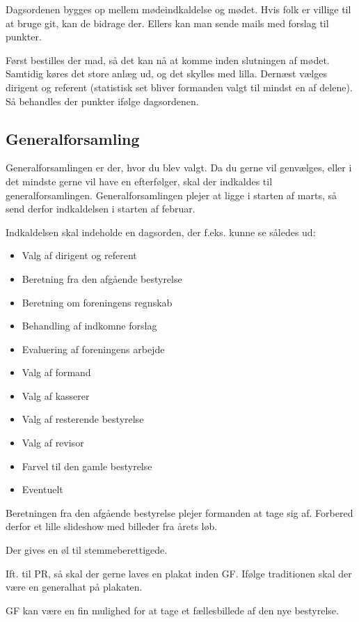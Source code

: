 Dagsordenen bygges op mellem mødeindkaldelse og mødet. Hvis folk er
villige til at bruge git, kan de bidrage der. Ellers kan man sende
mails med forslag til punkter.

Først bestilles der mad, så det kan nå at komme inden slutningen af
mødet. Samtidig køres det store anlæg ud, og det skylles med
lilla. Dernæst vælges dirigent og referent (statistisk set bliver
formanden valgt til mindst en af delene). Så behandles der punkter
ifølge dagsordenen.

\subsection{Generalforsamling}
\label{sec:generalforsamling}

Generalforsamlingen er der, hvor du blev valgt. Da du gerne vil
genvælges, eller i det mindste gerne vil have en efterfølger, skal der
indkaldes til generalforsamlingen. Generalforsamlingen plejer at ligge
i starten af marts, så send derfor indkaldelsen i starten af februar.

Indkaldelsen skal indeholde en dagsorden, der f.eks. kunne se således
ud:
\begin{itemize}
\item Valg af dirigent og referent
\item Beretning fra den afgående bestyrelse
\item Beretning om foreningens regnskab
\item Behandling af indkomne forslag
\item Evaluering af foreningens arbejde
\item Valg af formand
\item Valg af kasserer
\item Valg af resterende bestyrelse
\item Valg af revisor
\item Farvel til den gamle bestyrelse
\item Eventuelt
\end{itemize}

Beretningen fra den afgående bestyrelse plejer formanden at tage sig
af. Forbered derfor et lille slideshow med billeder fra årets løb.

Der gives en øl til stemmeberettigede.

Ift. til PR, så skal der gerne laves en plakat inden GF. Ifølge
traditionen skal der være en generalhat på plakaten.

GF kan være en fin mulighed for at tage et fællesbillede af den nye
bestyrelse.

